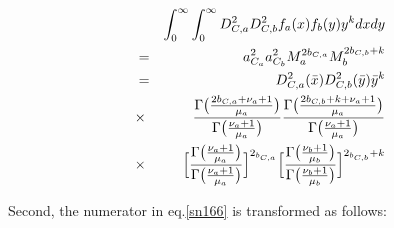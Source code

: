 \begin{eqnarray}
& &\int_{0}^{\infty}\int_{0}^{\infty}D_{C,a}^{2}D_{C,b}^{2}f_{a}(x)f_{b}(y)y^{k}dxdy\nonumber\\
&=&a_{C_{a}}^{2}a_{C_{b}}^{2}M_{a}^{2b_{C,a}}M_{b}^{2b_{C,b}+k}\nonumber\\
&=&D_{C,a}^{2}(\bar{x})D_{C,b}^{2}(\bar{y})\bar{y}^{k}\nonumber\\
&\times&\frac{\Gamma\bigl(\frac{2b_{C,a}+\nu_{a}+1}{\mu_{a}}\bigr)}{\Gamma\bigl(\frac{\nu_{a}+1}{\mu_{a}}\bigr)}
\frac{\Gamma\bigl(\frac{2b_{C,b}+k+\nu_{a}+1}{\mu_{a}}\bigr)}{\Gamma\bigl(\frac{\nu_{a}+1}{\mu_{a}}\bigr)}\nonumber\\
&\times&\Bigl[\frac{\Gamma\bigl(\frac{\nu_{a}+1}{\mu_{a}}\bigr)}{\Gamma\bigl(\frac{\nu_{a}+1}{\mu_{a}}\bigr)}\Bigl]^{2_{b_{C,a}}}
\Bigl[\frac{\Gamma\bigl(\frac{\nu_{b}+1}{\mu_{b}}\bigr)}{\Gamma\bigl(\frac{\nu_{b}+1}{\mu_{b}}\bigr)}\Bigl]^{2_{b_{C,b}}+k}\label{sn168}
\end{eqnarray}

Second, the numerator in eq.\ref{sn166} is transformed as follows:



